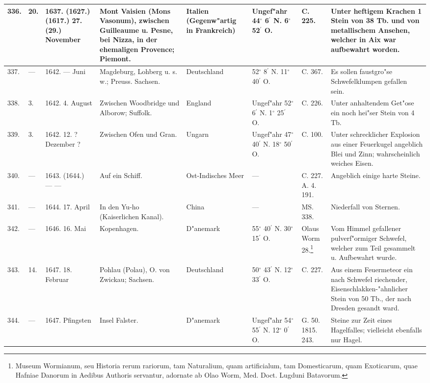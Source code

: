 \documentclass[a4paper, 8pt, oneside, polutonikogreek, german]{article}
\begin{document}
\begin{center}
\begin{longtable}{| p{5mm} | p{3mm} | p{15mm} | p{25mm} | p{20mm} | p{14mm} | p{17mm} | p{24mm} |}
        336. & 20. & 1637. (1627.) (1617.) 27. (29.) November & Mont Vaisien (Mons Vasonum), zwischen Guilleaume u. Pesne, bei Nizza, in der ehemaligen Provence; Piemont. & Italien (Gegenw"artig in Frankreich) & Ungef"ahr 44$^\circ$ 6$^\prime$ N. 6$^\circ$ 52$^\prime$ O. & C. 225. & Unter heftigem Krachen 1 Stein von 38 Tb. und von metallischem Ansehen, welcher in Aix war aufbewahrt worden. \\ \hline
        337. & --- & 1642. --- Juni & Magdeburg, Lohberg u. s. w.; Preuss. Sachsen. & Deutschland & 52$^\circ$ 8$^\prime$ N. 11$^\circ$ 40$^\prime$ O. & C. 367. & Es sollen faustgro"se Schwefelklumpen gefallen sein. \\ \hline
        338. & 3. & 1642. 4. August & Zwischen Woodbridge und Alborow; Suffolk. & England & Ungef"ahr 52$^\circ$ 6$^\prime$ N. 1$^\circ$ 25$^\prime$ O. & C. 226. & Unter anhaltendem Get"ose ein noch hei"ser Stein von 4 Tb. \\ \hline
        339. & 3. & 1642. 12. ? Dezember ? & Zwischen Ofen und Gran. & Ungarn & Ungef"ahr 47$^\circ$ 40$^\prime$ N. 18$^\circ$ 50$^\prime$ O. & C. 100. & Unter schrecklicher Explosion aus einer Feuerkugel angeblich Blei und Zinn; wahrscheinlich weiches Eisen. \\ \hline
        340. & --- & 1643. (1644.) --- --- & Auf ein Schiff. & Ost-Indisches Meer & --- & C. 227. A. 4. 191. & Angeblich einige harte Steine. \\ \hline
        341. & --- & 1644. 17. April & In den Yu-ho (Kaiserlichen Kanal). & China & --- & MS. 338. & Niederfall von Sternen. \\ \hline
        342. & --- & 1646. 16. Mai & Kopenhagen. & D"anemark & 55$^\circ$ 40$^\prime$ N. 30$^\circ$ 15$^\prime$ O. & Olaus Worm 28.\footnote{Museum Wormianum, seu Historia rerum rariorum, tam Naturalium, quam artificialum, tam Domesticarum, quam Exoticarum, quae Hafniae Danorum in Aedibus Authoris servantur, adornate ab Olao Worm, Med. Doct. Lugduni Batavorum.} & Vom Himmel gefallener pulverf"ormiger Schwefel, welcher zum Teil gesammelt u. Aufbewahrt wurde. \\ \hline
        343. & 14. & 1647. 18. Februar & Pohlau (Polau), O. von Zwickau; Sachsen. & Deutschland & 50$^\circ$ 43$^\prime$ N. 12$^\circ$ 33$^\prime$ O. & C. 227. & Aus einem Feuermeteor ein nach Schwefel riechender, Eisenschlakken-"ahnlicher Stein von 50 Tb., der nach Dresden gesandt ward. \\ \hline
        344. & --- & 1647. Pfingsten & Insel Falster. & D"anemark & Ungef"ahr 54$^\circ$ 55$^\prime$ N. 12$^\circ$ 0$^\prime$ O. & G. 50. 1815. 243. & Steine zur Zeit eines Hagelfalles; vielleicht ebenfalls nur Hagel. \\ \hline

\end{longtable}
\end{center}
\end{document}
